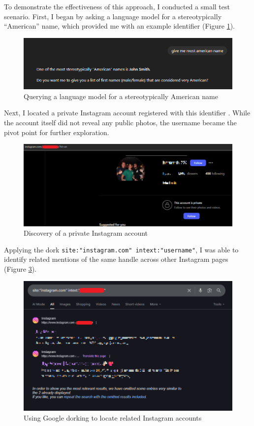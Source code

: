 \documentclass[12pt]{article}
\begin{document}
To demonstrate the effectiveness of this approach, I conducted a small test scenario. First, I began by asking a language model for a stereotypically ``American'' name, which provided me with an example identifier (Figure \ref{fig:gpt}).

\begin{figure}[H]
    \centering
    \includegraphics[width=0.6\linewidth]{1.png}
    \caption{Querying a language model for a stereotypically American name}
    \label{fig:gpt}
\end{figure}

Next, I located a private Instagram account registered with this identifier . While the account itself did not reveal any public photos, the username became the pivot point for further exploration.  

\begin{figure}[H]
    \centering
    \includegraphics[width=0.6\linewidth]{2.png}
    \caption{Discovery of a private Instagram account}
    \label{fig:private}
\end{figure}

Applying the dork \texttt{site:"instagram.com" intext:"username"}, I was able to identify related mentions of the same handle across other Instagram pages (Figure \ref{fig:dork}).  

\begin{figure}[H]
    \centering
    \includegraphics[width=0.7\linewidth]{3.png}
    \caption{Using Google dorking to locate related Instagram accounts}
    \label{fig:dork}
\end{figure}
\end{document}
